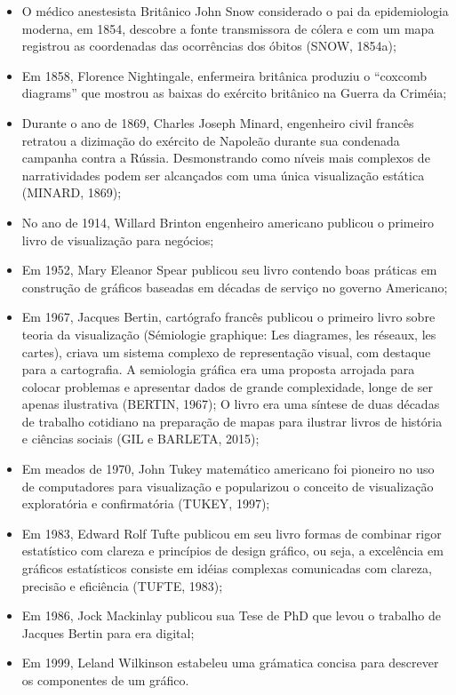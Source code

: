 \begin{itemize}
  \item O médico anestesista Britânico John Snow considerado o pai da epidemiologia moderna, em 1854, descobre a fonte transmissora de cólera e com um mapa registrou as coordenadas das ocorrências dos óbitos (SNOW, 1854a);
  \item Em 1858, Florence Nightingale, enfermeira britânica produziu o “coxcomb diagrams” que mostrou as baixas do exército britânico na Guerra da Criméia;
  \item Durante o ano de 1869, Charles Joseph Minard, engenheiro civil francês retratou a dizimação do exército de Napoleão durante sua condenada campanha contra a Rússia. Desmonstrando como níveis mais complexos de narratividades podem ser alcançados com uma única visualização estática (MINARD, 1869);
  \item No ano de 1914, Willard Brinton engenheiro americano publicou o primeiro livro de visualização para negócios;
  \item Em 1952, Mary Eleanor Spear publicou seu livro contendo boas práticas em construção de gráficos baseadas em décadas de serviço no governo Americano;
  \item Em 1967, Jacques Bertin, cartógrafo francês publicou o primeiro livro sobre teoria da visualização (Sémiologie graphique: Les diagrames, les
réseaux, les cartes), criava um sistema complexo de representação visual, com destaque para a cartografia. A semiologia gráfica era uma proposta arrojada para colocar problemas e apresentar dados de grande complexidade, longe de ser apenas ilustrativa (BERTIN, 1967); O livro era uma síntese de duas décadas de trabalho cotidiano na preparação de mapas para ilustrar livros de história e ciências sociais (GIL e BARLETA, 2015);
  \item  Em meados de 1970, John Tukey matemático americano foi pioneiro no uso de computadores para visualização e popularizou o conceito de visualização exploratória e confirmatória (TUKEY, 1997);
  \item Em 1983, Edward Rolf Tufte publicou em seu livro formas de combinar rigor estatístico com clareza e princípios de design gráfico, ou seja, a excelência em gráficos estatísticos consiste em idéias complexas comunicadas com clareza, precisão e eficiência (TUFTE, 1983);
  \item Em 1986, Jock Mackinlay publicou sua Tese de PhD que levou o trabalho de Jacques Bertin para era digital;
  \item Em 1999, Leland Wilkinson estabeleu uma grámatica concisa para
descrever os componentes de um gráfico.
\end{itemize}


